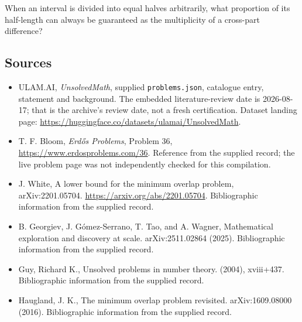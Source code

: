 \documentclass[11pt,a4paper]{article}
\begin{document}
When an interval is divided into equal halves arbitrarily, what proportion of its half-length can always be guaranteed as the multiplicity of a cross-part difference?

\subsection{Sources}

{\small

\begin{itemize}

\item[\hypertarget{source:statement:1}{S1}] ULAM.AI, \emph{UnsolvedMath}, supplied \texttt{problems.json}, catalogue entry, statement and background. The embedded literature-review date is 2026-08-17; that is the archive’s review date, not a fresh certification. Dataset landing page: \url{https://huggingface.co/datasets/ulamai/UnsolvedMath}.

\item[\hypertarget{source:statement:2}{S2}] T. F. Bloom, \emph{Erdős Problems}, Problem 36, \url{https://www.erdosproblems.com/36}. Reference from the supplied record; the live problem page was not independently checked for this compilation.

\item[\hypertarget{source:statement:3}{S3}] J. White, A lower bound for the minimum overlap problem, arXiv:2201.05704. \url{https://arxiv.org/abs/2201.05704}. Bibliographic information from the supplied record.

\item[\hypertarget{source:statement:4}{S4}] B. Georgiev, J. G\'{o}mez-Serrano, T. Tao, and A. Wagner, Mathematical exploration and discovery at scale. arXiv:2511.02864 (2025). Bibliographic information from the supplied record.

\item[\hypertarget{source:statement:5}{S5}] Guy, Richard K., Unsolved problems in number theory. (2004), xviii+437. Bibliographic information from the supplied record.

\item[\hypertarget{source:statement:6}{S6}] Haugland, J. K., The minimum overlap problem revisited. arXiv:1609.08000 (2016). Bibliographic information from the supplied record.

\end{itemize}

}

\label{end:statement}
\end{document}
